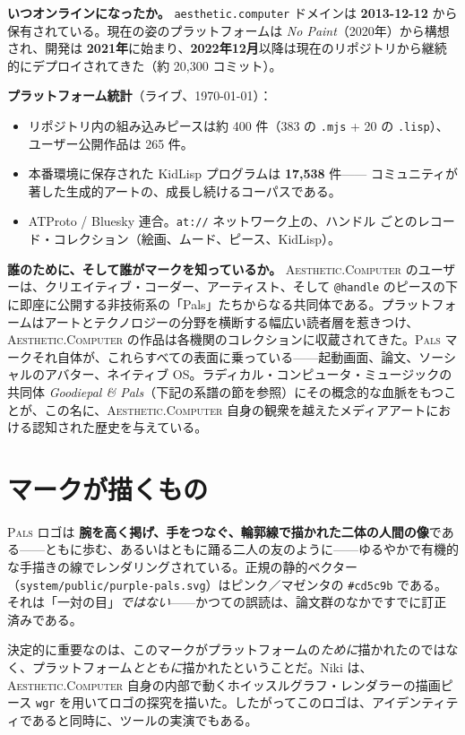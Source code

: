 \documentclass[10pt,letterpaper,twocolumn]{article}
\newcommand{\ac}{\textsc{Aesthetic}{\color{acpink}.}\textsc{Computer}}
\newcommand{\pals}{\textsc{Pals}}
\begin{document}
\textbf{いつオンラインになったか。} \texttt{aesthetic.computer} ドメインは \textbf{2013-12-12} から保有されている。現在の姿のプラットフォームは \emph{No Paint}（2020年）から構想され、開発は \textbf{2021年}に始まり、\textbf{2022年12月}以降は現在のリポジトリから継続的にデプロイされてきた（約 20{,}300 コミット）。

\textbf{プラットフォーム統計}（ライブ、\today）：
\begin{itemize}
  \item リポジトリ内の組み込みピースは約 400 件（383 の \texttt{.mjs} +
        20 の \texttt{.lisp}）、ユーザー公開作品は 265 件。
  \item 本番環境に保存された KidLisp プログラムは \textbf{17{,}538} 件——
        コミュニティが著した生成的アートの、成長し続けるコーパスである。
  \item ATProto / Bluesky 連合。\texttt{at://} ネットワーク上の、ハンドル
        ごとのレコード・コレクション（絵画、ムード、ピース、KidLisp）。
\end{itemize}

\textbf{誰のために、そして誰がマークを知っているか。} \ac{} のユーザーは、クリエイティブ・コーダー、アーティスト、そして \texttt{@handle} のピースの下に即座に公開する非技術系の「Pals」たちからなる共同体である。プラットフォームはアートとテクノロジーの分野を横断する幅広い読者層を惹きつけ、\ac{} の作品は各機関のコレクションに収蔵されてきた。\pals{} マークそれ自体が、これらすべての表面に乗っている——起動画面、論文、ソーシャルのアバター、ネイティブ OS。ラディカル・コンピュータ・ミュージックの共同体 \emph{Goodiepal \& Pals}（下記の系譜の節を参照）にその概念的な血脈をもつことが、この名に、\ac{} 自身の観衆を越えたメディアアートにおける認知された歴史を与えている。

\section{マークが描くもの}

\pals{} ロゴは \textbf{腕を高く掲げ、手をつなぐ、輪郭線で描かれた二体の人間の像}である——ともに歩む、あるいはともに踊る二人の友のように——ゆるやかで有機的な手描きの線でレンダリングされている。正規の静的ベクター（\texttt{system/public/purple-pals.svg}）はピンク／マゼンタの \texttt{\#cd5c9b} である。それは「一対の目」\emph{ではない}——かつての誤読は、論文群のなかですでに訂正済みである。

決定的に重要なのは、このマークがプラットフォームの\emph{ために}描かれたのではなく、プラットフォーム\emph{とともに}描かれたということだ。Niki は、\ac{} 自身の内部で動くホイッスルグラフ・レンダラーの描画ピース \texttt{wgr} を用いてロゴの探究を描いた。したがってこのロゴは、アイデンティティであると同時に、ツールの実演でもある。
\end{document}
